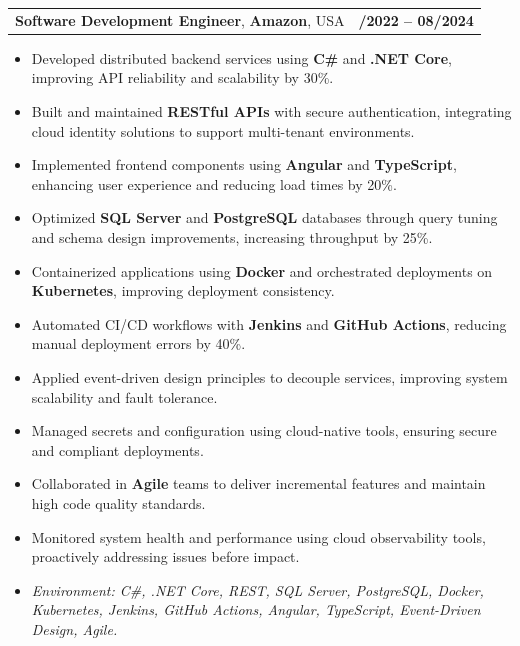 \documentclass[letterpaper,11pt]{article}
\makeatletter
\newcommand{\resumeItem}[1]{
  \item\footnotesize{
    {#1 \vspace{-2pt}}
  }
}
\newcommand{\resumeSubheading}[4]{
  \vspace{-2pt}\item
    \begin{tabular*}{1.0\textwidth}[t]{l@{\extracolsep{\fill}}r}
      \textbf{\fontsize{10pt}{14pt}\selectfont #3}, \textbf{\fontsize{10pt}{14pt}\selectfont #1}, \fontsize{10pt}{14pt}\selectfont #4 & \textbf{\fontsize{10pt}{14pt}\selectfont #2} \\
    \end{tabular*}\vspace{-7pt}
}
\newcommand{\resumeItemListStart}{\begin{itemize}[leftmargin=*]}
\newcommand{\resumeItemListEnd}{\end{itemize}\vspace{-5pt}}
\makeatother
\begin{document}
\resumeSubheading
{Amazon}{10/2022 -- 08/2024}
{Software Development Engineer}{USA}
\resumeItemListStart
  \resumeItem{Developed distributed backend services using \textbf{C\#} and \textbf{.NET Core}, improving API reliability and scalability by 30\%.}
  \resumeItem{Built and maintained \textbf{RESTful APIs} with secure authentication, integrating cloud identity solutions to support multi-tenant environments.}
  \resumeItem{Implemented frontend components using \textbf{Angular} and \textbf{TypeScript}, enhancing user experience and reducing load times by 20\%.}
  \resumeItem{Optimized \textbf{SQL Server} and \textbf{PostgreSQL} databases through query tuning and schema design improvements, increasing throughput by 25\%.}
  \resumeItem{Containerized applications using \textbf{Docker} and orchestrated deployments on \textbf{Kubernetes}, improving deployment consistency.}
  \resumeItem{Automated CI/CD workflows with \textbf{Jenkins} and \textbf{GitHub Actions}, reducing manual deployment errors by 40\%.}
  \resumeItem{Applied event-driven design principles to decouple services, improving system scalability and fault tolerance.}
  \resumeItem{Managed secrets and configuration using cloud-native tools, ensuring secure and compliant deployments.}
  \resumeItem{Collaborated in \textbf{Agile} teams to deliver incremental features and maintain high code quality standards.}
  \resumeItem{Monitored system health and performance using cloud observability tools, proactively addressing issues before impact.}
  \resumeItem{\textit{Environment: C\#, .NET Core, REST, SQL Server, PostgreSQL, Docker, Kubernetes, Jenkins, GitHub Actions, Angular, TypeScript, Event-Driven Design, Agile.}}
\resumeItemListEnd
\end{document}
